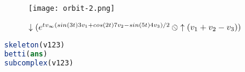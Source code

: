 \documentclass{juliacon}
\DeclareMathOperator*{\obackslash}{\text{\reflectbox{$\oslash$}}}
\begin{document}

\begin{figure}[t]
\centerline{\texttt{[image: orbit-2.png]}}
\caption*{$\downarrow(e^{tv_\infty(sin(3t)3v_1+cos(2t)7v_2-sin(5t)4v_3)/2}\obackslash\uparrow(v_1+v_2-v_3))$}
\end{figure}



\iffalse
\begin{figure}[t]
\centerline{\texttt{[image: orbit-1.png]}}
\caption{Modulated bivector group on Riemann sphere S"∞+++"}
\end{figure}
\fi


\begin{lstlisting}[language = Julia]
skeleton(v123)
betti(ans)
subcomplex(v123)
\end{lstlisting}



\end{document}
